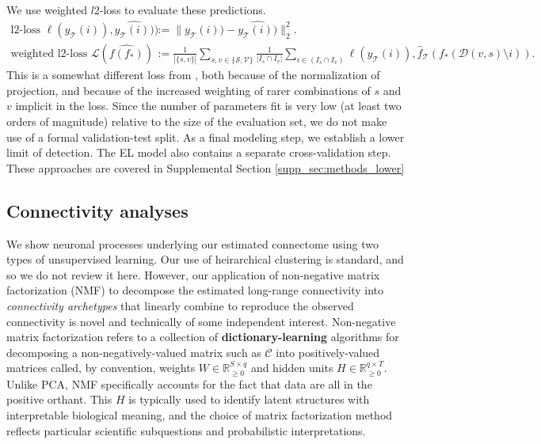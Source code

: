 We use weighted $l2$-loss to evaluate these predictions.
\begin{align*}
\text{l2-loss } \ell (y_{\mathcal T}(i)),\widehat {y_{\mathcal T}(i))}) &:=   \| y_{\mathcal T} (i)) - \widehat {y_{\mathcal T}(i))} \|_2^2. \\
\text{weighted l2-loss } \mathcal L ( \widehat {f(f_*)}) &:= \frac{1}{|\{s,v\}|} \sum_{s,v \in \{\mathcal S,\mathcal V\}} \frac{1}{ |I_{s} \cap I_v |} \sum_{i \in (I_{s} \cap I_v ) } \ell (y_{\mathcal T}(i)), \hat f_{\mathcal T} (f_*(\mathcal D(v,s) \setminus i)) .
\end{align*}
This is a somewhat different loss from \citet{Knox2019-ot}, both because of the normalization of projection, and because of the increased weighting of rarer combinations of $s$ and $v$ implicit in the loss.
Since the number of parameters fit is very low (at least two orders of magnitude) relative to the size of the evaluation set, we do not make use of a formal validation-test split.  %
As a final modeling step, we establish a lower limit of detection.
The EL model also contains a separate cross-validation step.
These approaches are covered in Supplemental Section \ref{supp_sec:methods_lower}

\newpage

\subsection{Connectivity analyses}

We show neuronal processes underlying our estimated connectome using two types of unsupervised learning.
Our use of heirarchical clustering is standard, and so we do not review it here.
However, our application of non-negative matrix factorization (NMF) to decompose the estimated long-range connectivity into \textit{connectivity archetypes} that linearly combine to reproduce the observed connectivity is novel and technically of some independent interest.
Non-negative matrix factorization refers to a collection of \textbf{dictionary-learning} algorithms for decomposing a non-negatively-valued matrix such as $\mathcal C $ into positively-valued matrices called, by convention, weights $W \in \mathbb R^{S \times q}_{\geq 0}$ and hidden units $H \in \mathbb R^{q  \times T}_{\geq 0}$.
Unlike PCA, NMF specifically accounts for the fact that data are all in the positive orthant.
This $H$ is typically used to identify latent structures with interpretable biological meaning, and the choice of matrix factorization method reflects particular scientific subquestions and probabilistic interpretations. 

